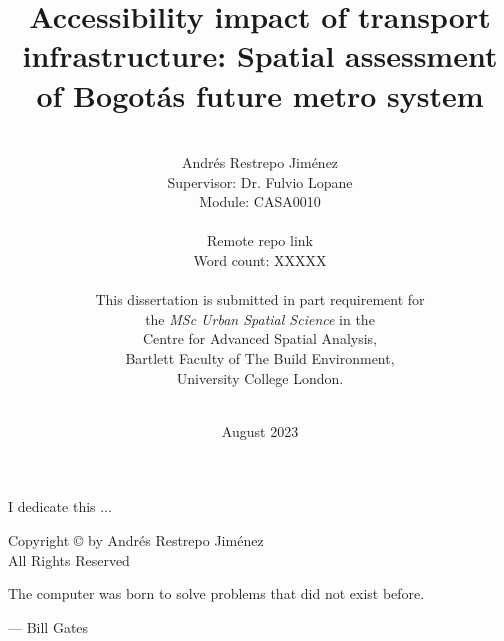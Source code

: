 \documentclass[12pt, a4paper]{report}
\date{August 2023}
\title{Accessibility impact of transport infrastructure: Spatial assessment of Bogot\'{a}\textquotesingle s future metro system}
\author{\\ \Large{Andr\'{e}s Restrepo Jim\'{e}nez}
\\ Supervisor: Dr. Fulvio Lopane 
\\ Module: CASA0010
\\
\\ Remote repo link
\\ Word count: XXXXX
\\
\\
This dissertation is submitted in part requirement for \\the \textit{MSc Urban Spatial Science} in the \\Centre for Advanced Spatial Analysis, \\Bartlett Faculty of The Build Environment, \\University College London.
\\ \\
}
\begin{document}
      

\thispagestyle{headings}
\maketitle
\FloatBarrier
{}

\thispagestyle{empty}
\begin{abstract}


\end{abstract}
\newpage
\thispagestyle{empty}
\begin{center}
I dedicate this ...
\end{center}

\newpage
\thispagestyle{empty}
\vspace*{\fill}
\begin{center}
Copyright \copyright  {} by Andr\'{e}s Restrepo Jim\'{e}nez \\ All Rights Reserved
\end{center}
\vspace*{\fill}
\newpage
\thispagestyle{empty}
\epigraph{The computer was born to solve problems that did not exist before.}{--- \textup{Bill Gates}}
\end{document}
